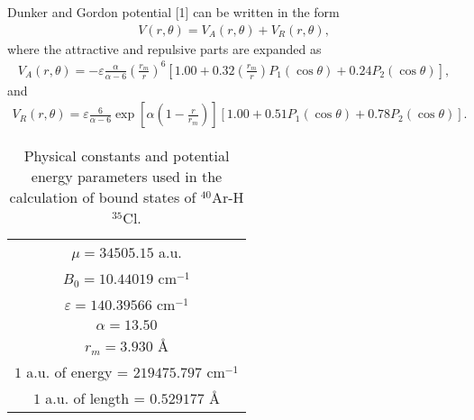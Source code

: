 \documentclass[12pt]{article}
\newcommand{\lb}{\left(}
\newcommand{\rb}{\right)}
\newcommand{\lsq}{\left[}
\newcommand{\rsq}{\right]}
\begin{document}
Dunker and Gordon potential [1] can be written in the form
\begin{gather}
    V(r, \theta) = V_A(r, \theta) + V_R(r, \theta),
\end{gather}
where the attractive and repulsive parts are expanded as
\begin{gather}
    V_A(r, \theta) = -\varepsilon \frac{\alpha}{\alpha - 6} \lb \frac{r_m}{r} \rb^6 \lsq 1.00 + 0.32 \lb \frac{r_m}{r} \rb P_1(\cos \theta) + 0.24 P_2 (\cos \theta) \rsq, 
\end{gather}
and
\begin{gather}
    V_R(r, \theta) = \varepsilon \frac{6}{\alpha - 6} \exp \lsq \alpha \lb 1 - \frac{r}{r_m} \rb \rsq \lsq 1.00 + 0.51 P_1(\cos \theta) + 0.78 P_2(\cos \theta) \rsq .
\end{gather}

\begin{table}[H]
    \begin{center}
    \caption{Physical constants and potential energy parameters used in the calculation of bound states of ${}^{40}$Ar-H${}^{35}$Cl.}
    \begin{tabular}{c}
        \toprule[1.5pt]
            $\mu = 34505.15$ a.u. \\
            $B_0 = 10.44019$ cm$^{-1}$ \\
            $\varepsilon = 140.39566$ cm$^{-1}$ \\
            $\alpha = 13.50$ \\
            $r_m = 3.930$ {\AA} \\
        \midrule
            $1$ a.u. of energy = $219475.797$ cm$^{-1}$ \\
            $1$ a.u. of length = $0.529177$ {\AA} \\
        \bottomrule
    \end{tabular}
    \end{center}
\end{table}
\end{document}
